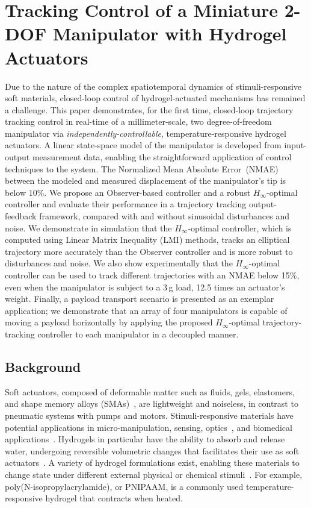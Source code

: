 \graphicspath{{Images/control/}}

\chapter{Tracking Control of a Miniature 2-DOF Manipulator with Hydrogel Actuators}
\label{chap:control}
Due to the nature of the complex spatiotemporal dynamics of stimuli-responsive soft materials, closed-loop control of hydrogel-actuated mechanisms has remained a challenge. This paper demonstrates, for the first time, closed-loop trajectory tracking control in real-time of a millimeter-scale, two degree-of-freedom manipulator via \emph{independently-controllable}, temperature-responsive hydrogel actuators. A linear state-space model of the manipulator is developed from input-output measurement data, enabling the straightforward application of control techniques to the system. The Normalized Mean Absolute Error~(NMAE) between the modeled and measured displacement of the manipulator's tip is below 10\%. We propose an Observer-based controller and a robust $H_{\infty}$-optimal controller and evaluate their 
performance in a trajectory tracking output-feedback framework, compared with and without sinusoidal disturbances and noise. We demonstrate in simulation that the $H_\infty$-optimal controller, which is computed using Linear Matrix Inequality (LMI) methods, tracks an elliptical trajectory more accurately than the Observer controller and is more robust to disturbances and noise. We also show experimentally that the $H_\infty$-optimal controller can be used to track different trajectories with an NMAE below 15$\%$, even when the manipulator is subject to a 3\,g load, 12.5 times an actuator's weight. Finally, a payload transport scenario is presented as an exemplar application; we demonstrate that an array of four manipulators is capable of moving a payload horizontally by applying the proposed $H_\infty$-optimal trajectory-tracking controller to each manipulator in a decoupled manner.
\section{Background}
Soft actuators, composed of deformable matter such as fluids, gels, elastomers, and shape memory alloys (SMAs)~\cite{Majidi2014}, are lightweight and noiseless, in contrast to pneumatic systems with pumps and motors. Stimuli-responsive materials have potential applications in micro-manipulation, sensing, optics~\cite{Mantha2019,Qin2019}, and biomedical applications~\cite{Guiseppi-Elie2010}. Hydrogels in particular have the ability to absorb and release water, undergoing reversible volumetric changes that facilitates their use as soft actuators~\cite{Mishra2020}. A variety of hydrogel formulations exist, enabling these materials to change state under different external physical or chemical stimuli~\cite{Peng2018,He2012}. For example, poly(N-isopropylacrylamide), or PNIPAAM, is a commonly used temperature-responsive hydrogel that contracts when heated.

